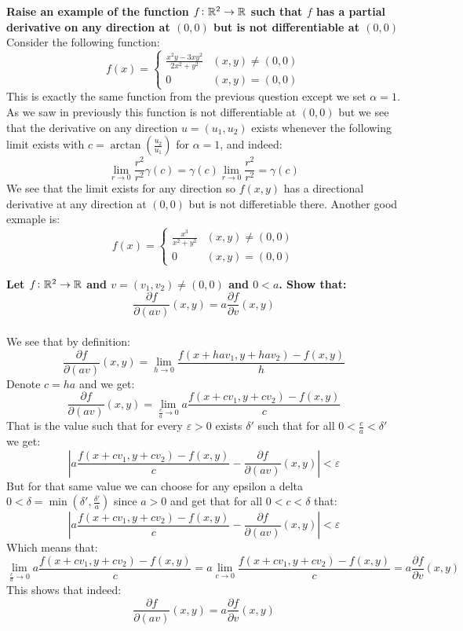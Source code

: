 \documentclass[11pt,a4paper]{article}
\begin{document}
	\textbf{Raise an example of the function $f\colon \mathbb{R}^2\to\mathbb{R}$ such that 
	$f$ has a partial derivative on any direction at $(0,0)$ but is not 
	differentiable at $(0,0)$} \\
	Consider the following function:
	\[
		f(x) = 
		\begin{cases}
			\frac{x^2y-3xy^2}{2x^2+y^2} & (x,y) \neq (0,0) \\
			0 & (x,y) = (0,0)
		\end{cases}
	\]
	This is exactly the same function from the previous question except
	we set $\alpha=1$. As we saw in previously this function is
	not differentiable at $(0,0)$ but we see that
	the derivative on any direction $u=(u_1,u_2)$ exists whenever
	the following limit exists with $c=\arctan(\frac{u_2}{u_1})$ for
	$\alpha = 1$, and indeed:
	\[
		\lim_{r\to 0}{\frac{r^2}{r^{2}}\gamma(c)} = 
		\gamma(c)\lim_{r\to 0}{\frac{r^2}{r^{2}}} = \gamma(c)
	\]
	We see that the limit exists for any direction so $f(x,y)$ has a directional
	derivative at any direction at $(0,0)$ but is not differetiable there.
	Another good exmaple is:
	\[
		f(x) = 
		\begin{cases}
			\frac{x^3}{x^2+y^2} & (x,y) \neq (0,0) \\
			0 & (x,y) = (0,0)
		\end{cases}
	\]
	
	\newpage
	
	\textbf{Let $f\colon\mathbb{R}^2\to\mathbb{R}$ and $v=(v_1,v_2)\neq(0,0)$ and $0 < a$.
	Show that:
	\[
		\frac{\partial f}{\partial (av)}(x,y) = 
	    a \frac{\partial f}{\partial v}(x,y)
	\]} \\
	We see that by definition:
	\[
		\frac{\partial f}{\partial (av)}(x,y) = 
		\lim_{h\to 0}{\frac{f(x+hav_1,y+hav_2)-f(x,y)}{h}}
	\]
	Denote $c=ha$ and we get:
	\[
		\frac{\partial f}{\partial (av)}(x,y) = 
		\lim_{\frac{c}{a}\to 0}{a\frac{f(x+cv_1,y+cv_2)-f(x,y)}{c}}
	\]
	That is the value such that for every $\varepsilon > 0$ exists $\delta'$
	such that for all $0 < \frac{c}{a} < \delta'$ we get:
	\[
		\left\vert a\frac{f(x+cv_1,y+cv_2)-f(x,y)}{c} - 
		\frac{\partial f}{\partial (av)}(x,y) \right\vert < \varepsilon
	\]
	But for that same value we can choose for any epsilon a delta
	$0 < \delta=\min(\delta',\frac{\delta'}{a})$ since $a > 0$ and get that
	for all $0 < c < \delta$ that:
	\[
		\left\vert a\frac{f(x+cv_1,y+cv_2)-f(x,y)}{c} - 
		\frac{\partial f}{\partial (av)}(x,y) \right\vert < \varepsilon
	\]
	Which means that:
	\[
		\lim_{\frac{c}{a}\to 0}{a\frac{f(x+cv_1,y+cv_2)-f(x,y)}{c}} = 
		a\lim_{c\to 0}{\frac{f(x+cv_1,y+cv_2)-f(x,y)}{c}} = 
		a \frac{\partial f}{\partial v}(x,y)
	\]
	This shows that indeed:
	\[
		\boxed{\frac{\partial f}{\partial (av)}(x,y) = 
	    a \frac{\partial f}{\partial v}(x,y)}
	\]
	
\end{document}
